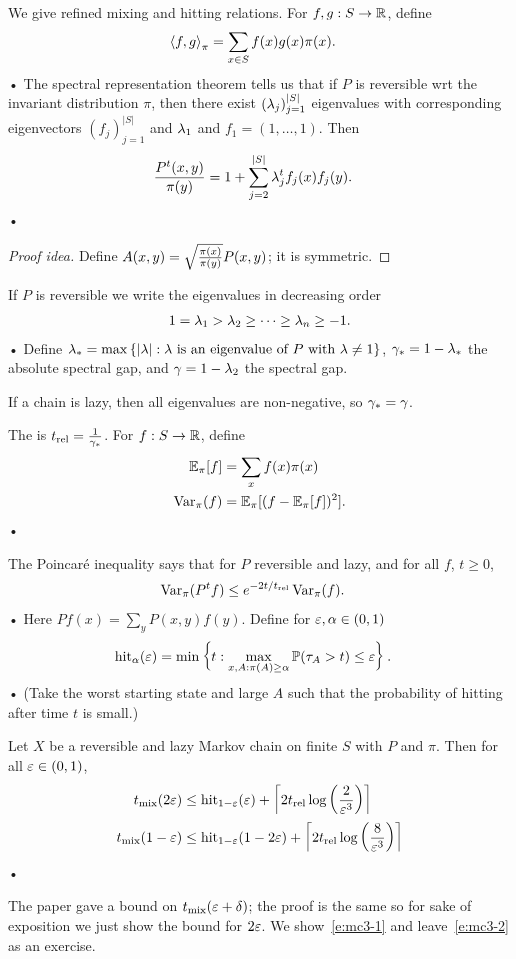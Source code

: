 We give refined mixing and hitting relations.
For $f,g:S\to \mathbb{R}$, define
\begin{align*}
\left\langle {f,g}\right\rangle_\pi &= \sum_{x\in S} f(x)g(x)\pi(x).
\end{align*}•
The spectral representation theorem tells us that if $P$ is reversible wrt the invariant distribution $\pi$, then there exist $(\lambda_j)_{j=1}^{|S|}$ eigenvalues with corresponding eigenvectors $(f_j)_{j=1}^{|S|}$ and $\lambda_1$ and $f_1=(1,\ldots, 1)$. Then 
\begin{align*}
\frac{P^t(x,y)}{\pi(y)} &= 1+ \sum_{j=2}^{|S|} \lambda_j^t f_j(x) f_j(y).
\end{align*}•
\begin{proof}[Proof idea]
Define $A(x,y) = \sqrt{\frac{\pi(x)}{\pi(y)}} P(x,y)$; it is symmetric. 
\end{proof}
If $P$ is reversible we write the eigenvalues in decreasing order
\begin{align*}
1=\lambda_1>\lambda_2\ge \cdots \ge \lambda_n\ge -1.
\end{align*}•
Define $\lambda_*=\max\left\{{|\lambda|}:{\lambda\text{ is an eigenvalue of }P\text{ with }\lambda\ne 1}\right\}$, $\gamma_*=1-\lambda_*$ the absolute spectral gap, and $\gamma=1-\lambda_2$ the spectral gap.

If a chain is lazy, then all eigenvalues are non-negative, so $\gamma_*=\gamma$. 

\begin{df}
The  is $t_{\text{rel}} = \frac{1}{\gamma_*}$. 
For $f:S\to \mathbb{R}$, define 
\begin{align*}
\mathbb{E}_\pi[f] &= \sum_x f(x) \pi(x)\\
\operatorname{Var}_\pi(f) &= \mathbb{E}_\pi[(f-\mathbb{E}_\pi[f])^2].
\end{align*}•
\end{df}
The Poincar\'e inequality says that for $P$ reversible and lazy, and for all $f$, $t\ge 0$, 
\begin{align*}
\operatorname{Var}_\pi (P^t f) &\le e^{-2t/t_{\text{rel}}}\operatorname{Var}_\pi(f).
\end{align*}•
Here $Pf(x) = \sum_y P(x,y)f(y)$. 
Define for $\varepsilon,\alpha\in (0,1)$
\begin{align*}
\text{hit}_\alpha(\varepsilon)&= \min\left\{{t}:{\max_{x,A:\pi(A)\ge \alpha}\mathbb{P}(\tau_A>t)\le \varepsilon}\right\}.
\end{align*}•
(Take the worst starting state and large $A$ such that the probability of hitting after time $t$ is small.)

\begin{thm}
Let $X$ be a reversible and lazy Markov chain on finite $S$ with $P$ and $\pi$. Then for all $\varepsilon\in (0,1)$,
\begin{align}
\label{e:mc3-1}
t_{\text{mix}}(2\varepsilon) &\le \text{hit}_{1-\varepsilon}(\varepsilon) + \left\lceil {2t_{\text{rel}} \log\left( {\frac{2}{\varepsilon^3}} \right)}\right\rceil\\
\label{e:mc3-2}
t_{\text{mix}}(1-\varepsilon) &\le \text{hit}_{1-\varepsilon}(1-2\varepsilon) + \left\lceil {2t_{\text{rel}} \log\left( {\frac{8}{\varepsilon^3}} \right)}\right\rceil
\end{align}•
\end{thm}
The paper gave a bound on $t_{\text{mix}}(\varepsilon+\delta)$; the proof is the same so for sake of exposition we just show the bound for $2\varepsilon$. We show~\eqref{e:mc3-1} and leave~\eqref{e:mc3-2} as an exercise.

